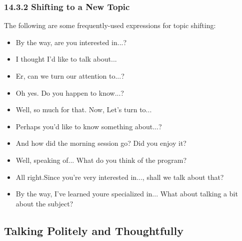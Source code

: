 \documentclass[aspectratio=169,UTF8,c]{beamer}%
\begin{document}
\begin{frame}
	\frametitle{14.3.2 Shifting to a New Topic}
	The following are some frequently-used expressions for topic shifting:
	\begin{itemize}
		\item By the way, are you interested in...?
		\item I thought I'd like to talk about...
		\item Er, can we turn our attention to...?
		\item Oh yes. Do you happen to know...?
		\item Well, so much for that. Now, Let's turn to...
		\item Perhaps you'd like to know something about...?
		\item And how did the morning session go? Did you enjoy it?
		\item Well, speaking of... What do you think of the program?
		\item All right.Since you're very interested in..., shall we talk about that?
		\item By the way, I've learned youre specialized in... What about talking a bit about the subject?
	\end{itemize}
\end{frame}

\subsection{Talking Politely and Thoughtfully}
\end{document}
